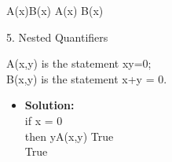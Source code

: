 \documentclass[11pt]{article}
\begin{document}
 \hspace{6cm} \large A(x)\land B(x) \neq A(x) \rightarrow B(x)\\


\pagebreak


\begin{flushleft}
{\Large 5. Nested Quantifiers  }
\end{flushleft}

\begin{enumerate}

\begin{flushleft}
{\Large A(x,y) is the statement xy=0;\\
\Large B(x,y) is the statement x+y = 0.\\}
\end{flushleft}
\end {enumerate}



\begin{itemize}
\Large a. \exists x \forall yA(x,y)\\
\\
\item  \hspace{.2cm} \textbf{Solution:}\\
\Large if \hspace{.2cm} x = 0\\
\Large then \hspace{.2cm}\forall yA(x,y) \equiv True\\
\Large \therefore True\\
\end{itemize}
\\
\\
\end{document}
